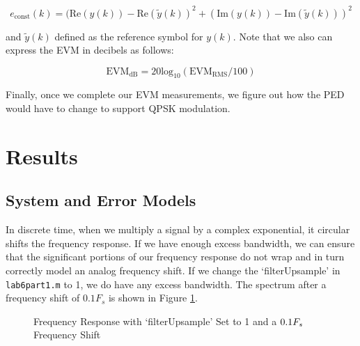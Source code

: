 \documentclass{article}
\begin{document}
\begin{equation}
	e_\text{const}(k) = (\text{Re}(y(k)) - \text{Re}(\tilde{y}(k))^2 + (\text{Im}(y(k)) - \text{Im}(\tilde{y}(k)))^2
\end{equation}

\noindent and $\tilde{y}(k)$ defined as the reference symbol for $y(k)$. Note that we also can express the EVM in decibels as follows:

\begin{equation}
	\text{EVM}_\text{dB} = 20\text{log}_{10}(\text{EVM}_\text{RMS}/100)
\end{equation}

\noindent Finally, once we complete our EVM measurements, we figure out how the PED would have to change to support QPSK modulation.

\section{Results}

\subsection{System and Error Models}

In discrete time, when we multiply a signal by a complex exponential, it circular shifts the frequency response. If we have enough excess bandwidth, we can ensure that the significant portions of our frequency response do not wrap and in turn correctly model an analog frequency shift. If we change the `filterUpsample' in \texttt{lab6part1.m} to 1, we do have any excess bandwidth. The spectrum after a frequency shift of $0.1F_s$ is shown in Figure \ref{fig::psd_upsample_1}.

\begin{figure}[H]
	\centerline{}
	\caption{Frequency Response with `filterUpsample' Set to 1 and a $\protect{0.1F_s}$ Frequency Shift}
	\label{fig::psd_upsample_1}
\end{figure}
\end{document}

